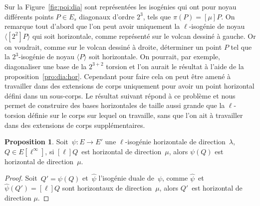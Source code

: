 \documentclass[10pt,a4paper]{book}
\theoremstyle{plain}
\theoremstyle{definition}
\theoremstyle{definition}
\theoremstyle{definition}
\newtheorem{prop}[thm]{Proposition}
\theoremstyle{definition}
\theoremstyle{remark}
\theoremstyle{remark}
\theoremstyle{definition}
\begin{document}
Sur la Figure~\ref{fig:poi:dia} sont représentées les isogénies qui ont pour
noyau différents points $P \in E_s $ diagonaux d'ordre $2^3$, tels que $\pi(P)=
[\mu]P$. On remarque tout d'abord que l'on peut avoir
uniquement la $\ell$-isogénie de noyau $\langle [2^2]P \rangle$ qui soit 
horizontale, comme représenté sur le volcan dessiné à gauche. Or on voudrait, 
comme sur le volcan dessiné à droite, déterminer un point $P$ tel que la 
$2^3$-isogénie de noyau $\langle P \rangle$ soit horizontale. On pourrait, par 
exemple, diagonaliser une base de la $2^{3+2}$ torsion et l'on 
aurait le résultat à l'aide de la proposition~\ref{pro:dia:hor}. Cependant pour
faire cela on peut être amené à travailler dans des extensions de corps 
uniquement pour avoir un point horizontal défini dans un sous-corps. Le 
résultat suivant répond à ce problème et nous permet de construire des bases 
horizontales de taille aussi grande que la $\ell$-torsion définie sur le corps 
sur lequel on travaille, sans que l'on ait à travailler dans des extensions de 
corps supplémentaires.

\begin{prop}\label{pro:pus:hor}
Soit~$\psi: E \rightarrow E'$ une $\ell$-isogénie horizontale de direction~$\lambda$,
$Q \in E[\ell^{\infty}]$,
si $[\ell] Q$~est horizontal de direction~$\mu$,
alors $\psi(Q)$ est horizontal de direction~$\mu$.
\end{prop}
\begin{proof}
Soit~$Q' = \psi(Q)$ et~$\widehat{\psi}$ l'isogénie duale de~$\psi$, 
comme $\widehat{\psi}$~et~$\widehat{\psi}(Q') = [\ell]Q$ sont horizontaux
de direction~$\mu$, alors $Q'$~est horizontal de direction $\mu$.
\end{proof}
\end{document}
